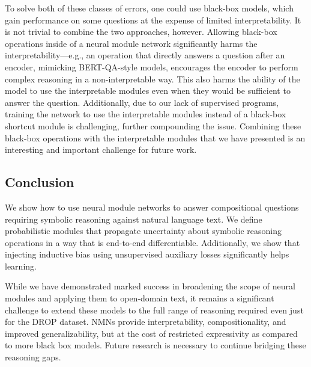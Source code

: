 \documentclass[main.tex]{subfiles}
\begin{document}
To solve both of these classes of errors, one could use black-box models, which gain performance on some questions at the expense of limited interpretability.  It is not trivial to combine the two approaches, however.  Allowing black-box operations inside of a neural module network significantly harms the interpretability---e.g., an operation that directly answers a question after an encoder, mimicking BERT-QA-style models, encourages the encoder to perform complex reasoning in a non-interpretable way. This also harms the ability of the model to use the interpretable modules even when they would be sufficient to answer the question.
Additionally, due to our lack of supervised programs, training the network to use the interpretable modules instead of a black-box shortcut module is challenging, further compounding the issue.
Combining these black-box operations with the interpretable modules that we have presented is an interesting and important challenge for future work.


\subsection{Conclusion}
We show how to use neural module networks to answer compositional questions requiring symbolic reasoning against natural language text.
We define probabilistic modules that propagate uncertainty about symbolic reasoning operations in a way that is end-to-end differentiable.
Additionally, we show that injecting inductive bias using unsupervised auxiliary losses significantly helps learning.

While we have demonstrated marked success in broadening the scope of neural modules and applying them to open-domain text, it remains a significant challenge to extend these models to the full range of reasoning required even just for the DROP dataset.
NMNs provide interpretability, compositionality, and improved generalizability, but at the cost of restricted expressivity as compared to more black box models.
Future research is necessary to continue bridging these reasoning gaps.


\biblio
\end{document}
